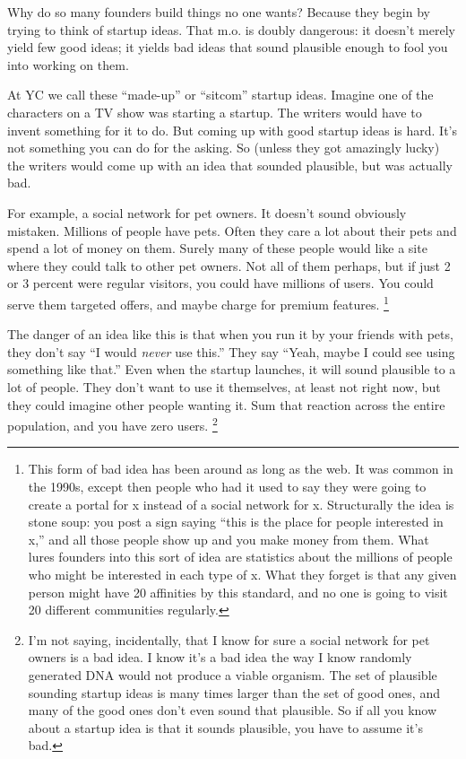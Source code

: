 \documentclass[12pt]{book}
\begin{document}
Why do so many founders build things no one wants? Because they begin by
trying to think of startup ideas. That m.o. is doubly dangerous: it
doesn't merely yield few good ideas; it yields bad ideas that sound
plausible enough to fool you into working on them.

At YC we call these ``made-up'' or ``sitcom'' startup ideas. Imagine one
of the characters on a TV show was starting a startup. The writers would
have to invent something for it to do. But coming up with good startup
ideas is hard. It's not something you can do for the asking. So (unless
they got amazingly lucky) the writers would come up with an idea that
sounded plausible, but was actually bad.

For example, a social network for pet owners. It doesn't sound obviously
mistaken. Millions of people have pets. Often they care a lot about
their pets and spend a lot of money on them. Surely many of these people
would like a site where they could talk to other pet owners. Not all of
them perhaps, but if just 2 or 3 percent were regular visitors, you
could have millions of users. You could serve them targeted offers, and
maybe charge for premium features. \footnote{This form of bad idea has been around as long as the web. It was
common in the 1990s, except then people who had it used to say they were
going to create a portal for x instead of a social network for x.
Structurally the idea is stone soup: you post a sign saying ``this is
the place for people interested in x,'' and all those people show up and
you make money from them. What lures founders into this sort of idea are
statistics about the millions of people who might be interested in each
type of x. What they forget is that any given person might have 20
affinities by this standard, and no one is going to visit 20 different
communities regularly.}

The danger of an idea like this is that when you run it by your friends
with pets, they don't say ``I would \emph{never} use this.'' They say
``Yeah, maybe I could see using something like that.'' Even when the
startup launches, it will sound plausible to a lot of people. They don't
want to use it themselves, at least not right now, but they could
imagine other people wanting it. Sum that reaction across the entire
population, and you have zero users. \footnote{I'm not saying, incidentally, that I know for sure a social
network for pet owners is a bad idea. I know it's a bad idea the way I
know randomly generated DNA would not produce a viable organism. The set
of plausible sounding startup ideas is many times larger than the set of
good ones, and many of the good ones don't even sound that plausible. So
if all you know about a startup idea is that it sounds plausible, you
have to assume it's bad.}
\end{document}
